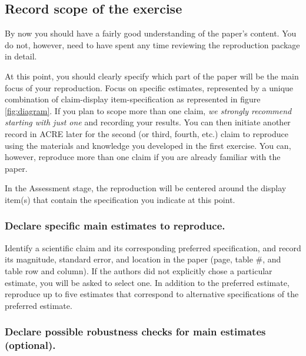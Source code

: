 \documentclass[]{book}
\begin{document}
\hypertarget{declare-estimates}{%
\subsection{Record scope of the exercise}\label{declare-estimates}}

By now you should have a fairly good understanding of the paper's content. You do not, however, need to have spent any time reviewing the reproduction package in detail.

At this point, you should clearly specify which part of the paper will be the main focus of your reproduction. Focus on specific estimates, represented by a unique combination of claim-display item-specification as represented in figure \ref{fig:diagram}. If you plan to scope more than one claim, \emph{we strongly recommend starting with just one} and recording your results. You can then initiate another record in ACRE later for the second (or third, fourth, etc.) claim to reproduce using the materials and knowledge you developed in the first exercise. You can, however, reproduce more than one claim if you are already familiar with the paper.

In the Assessment stage, the reproduction will be centered around the display item(s) that contain the specification you indicate at this point.

\hypertarget{declare-specific-main-estimates-to-reproduce.}{%
\subsubsection*{Declare specific main estimates to reproduce.}\label{declare-specific-main-estimates-to-reproduce.}}

Identify a scientific claim and its corresponding preferred specification, and record its magnitude, standard error, and location in the paper (page, table \#, and table row and column). If the authors did not explicitly chose a particular estimate, you will be asked to select one. In addition to the preferred estimate, reproduce up to five estimates that correspond to alternative specifications of the preferred estimate.

\hypertarget{declare-possible-robustness-checks-for-main-estimates-optional.}{%
\subsubsection*{Declare possible robustness checks for main estimates (optional).}\label{declare-possible-robustness-checks-for-main-estimates-optional.}}
\end{document}
